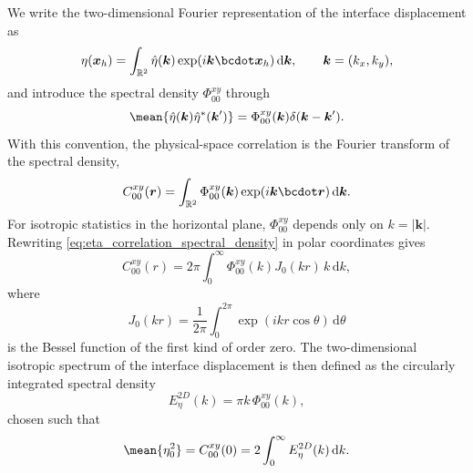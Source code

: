 We write the two-dimensional Fourier representation of the interface displacement as
\begin{equation}
    \eta(\boldsymbol{x}_h)
    =
    \int_{\mathbb{R}^2}
    \hat{\eta}(\boldsymbol{k})
    \exp(i\boldsymbol{k}\bcdot\boldsymbol{x}_h)
    \,\mathrm{d}\boldsymbol{k},
    \qquad
    \boldsymbol{k}=(k_x,k_y),
    \label{eq:eta_fourier_transform}
\end{equation}
and introduce the spectral density \(\Phi_{00}^{xy}\) through
\begin{equation}
    \mean{
        \hat{\eta}(\boldsymbol{k})
        \hat{\eta}^{\ast}(\boldsymbol{k}')
    }
    =
    \Phi_{00}^{xy}(\boldsymbol{k})
    \delta(\boldsymbol{k}-\boldsymbol{k}').
    \label{eq:eta_spectral_density_definition}
\end{equation}
With this convention, the physical-space correlation is the Fourier transform of the spectral density,
\begin{equation}
    C_{00}^{xy}(\boldsymbol{r})
    =
    \int_{\mathbb{R}^2}
    \Phi_{00}^{xy}(\boldsymbol{k})
    \exp(i\boldsymbol{k}\bcdot\boldsymbol{r})
    \,\mathrm{d}\boldsymbol{k}.
    \label{eq:eta_correlation_spectral_density}
\end{equation}
For isotropic statistics in the horizontal plane, \(\Phi_{00}^{xy}\) depends only on \(k=|\boldsymbol{k}|\). Rewriting \eqref{eq:eta_correlation_spectral_density} in polar coordinates gives
\begin{equation}
    C_{00}^{xy}(r)
    =
    2\pi
    \int_0^\infty
    \Phi_{00}^{xy}(k)
    J_0(kr)\,
    k\,\mathrm{d}k,
    \label{eq:eta_correlation_hankel_phi}
\end{equation}
where
\begin{equation}
    \label{eq:bessel_j0}
    J_0(kr)
    =
    \frac{1}{2\pi}
    \int_0^{2\pi}
    \exp(i k r \cos\theta)\,
    \mathrm{d}\theta
\end{equation}
is the Bessel function of the first kind of order zero. The two-dimensional isotropic spectrum of the interface displacement is then defined as the circularly integrated spectral density
\begin{equation}
    E_{\eta}^{2D}(k)
    =
    \pi k\,\Phi_{00}^{xy}(k),
    \label{eq:eta_2d_spectrum_definition}
\end{equation}
chosen such that
\begin{equation}
    \mean{\eta_0^2}
    =
    C_{00}^{xy}(0)
    =
    2
    \int_0^\infty
    E_{\eta}^{2D}(k)\,
    \mathrm{d}k.
    \label{eq:eta_variance_spectrum}
\end{equation}
